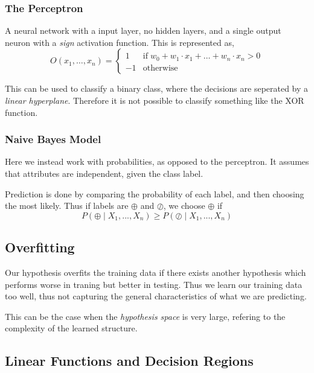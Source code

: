 \subsubsection{The Perceptron}

A neural network with a input layer, no hidden layers, and a single output neuron with a \emph{sign} activation function.
This is represented as,
\[
    O(x_1, \dots, x_n) = \left\{
        \begin{array}{ll}
            1 & \mathrm{if}\; w_0 + w_1 \cdot x_1 + \dots + w_n \cdot x_n > 0 \\
            -1 & \mathrm{otherwise}
        \end{array}
        \right.
\]

This can be used to classify a binary class, where the decisions are seperated by a \emph{linear hyperplane}.
Therefore it is not possible to classify something like the XOR function.

\subsubsection{Naive Bayes Model}

Here we instead work with probabilities, as opposed to the perceptron.
It assumes that attributes are independent, given the class label.

Prediction is done by comparing the probability of each label, and then choosing the most likely.
Thus if labels are $\oplus$ and $\oslash$, we choose $\oplus$ if
\[
    P(\oplus \mid X_1, ..., X_n) \geq P(\oslash \mid X_1, ..., X_n)
\]

\subsection{Overfitting}

Our hypothesis overfits the training data if there exists another hypothesis which performs worse in traning but better in testing.
Thus we learn our training data too well, thus not capturing the general characteristics of what we are predicting.

This can be the case when the \emph{hypothesis space} is very large, refering to the complexity of the learned structure.

\subsection{Linear Functions and Decision Regions}

